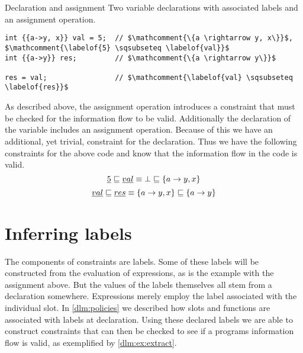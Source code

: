 \begin{example}{Declaration and assignment}\label{dlm:ex:extract}
  Two variable declarations with associated labels and an assignment operation.

  \begin{lstlisting}[style=dlmc]
int {{a->y, x}} val = 5;  // $\mathcomment{\{a \rightarrow y, x\}}$, $\mathcomment{\labelof{5} \sqsubseteq \labelof{val}}$
int {{a->y}} res;         // $\mathcomment{\{a \rightarrow y\}}$

res = val;                // $\mathcomment{\labelof{val} \sqsubseteq \labelof{res}}$
  \end{lstlisting}

  As described above, the assignment operation introduces a constraint that must be checked for the information flow to be valid.
  Additionally the declaration of the  variable includes an assignment operation.
  Because of this we have an additional, yet trivial, constraint for the declaration.
  Thus we have the following constraints for the above code and know that the information flow in the code is valid.
  $$\underline{5} \sqsubseteq \underline{val} \equiv \bot \sqsubseteq \{a \rightarrow y, x\}$$
  $$\underline{val} \sqsubseteq \underline{res} \equiv \{a \rightarrow y, x\} \sqsubseteq \{a \rightarrow y\}$$
\end{example}


\section{Inferring labels}\label{dlm:inferring_labels}
The components of constraints are labels.
Some of these labels will be constructed from the evaluation of expressions, as is the example with the assignment above.
But the values of the labels themselves all stem from a declaration somewhere.
Expressions merely employ the label associated with the individual slot.
In \cref{dlm:policies} we described how slots and functions are associated with labels at declaration.
Using these declared labels we are able to construct constraints that can then be checked to see if a programs information flow is valid, as exemplified by \cref{dlm:ex:extract}.


